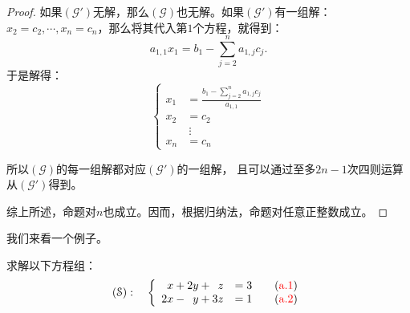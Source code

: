\documentclass[12pt,UTF8,fontset=none]{ctexbook}
\begin{document}
\begin{proof}
    如果$(\mathcal{G}')$无解，那么$(\mathcal{G})$也无解。如果$(\mathcal{G}')$有一组解：
    $x_2 = c_2, \cdots , x_n = c_n$，那么将其代入第$1$个方程，就得到：
    $$ a_{1,1} x_1 = b_{1} - \sum_{j=2}^n a_{1,j} c_j. $$
    于是解得：
    $$ \left\{
        \begin{array}{rl}
        x_1 &= \displaystyle \frac{b_{1} - \sum_{j=2}^n a_{1,j} c_j}{a_{1,1}} \\
        x_2 &= c_2  \\
        \quad & \:\vdots   \\
        x_n &= c_n 
        \end{array}
    \right.$$

    所以$(\mathcal{G})$的每一组解都对应$(\mathcal{G}')$的一组解，
    且可以通过至多$2n-1$次四则运算从$(\mathcal{G}')$得到。

    综上所述，命题对$n$也成立。因而，根据归纳法，命题对任意正整数成立。

\end{proof}

我们来看一个例子。

\begin{et}
    求解以下方程组：
    $$ (\mathcal{S}):\quad \left\{
        \begin{array}{rl}
    x + 2y + \phantom{0}z &= 3 \quad \quad ({\color{red}\mathrm{a}.1})\\
    2x - \phantom{0}y + 3z &= 1  \quad \quad ({\color{red}\mathrm{a}.2})
    \end{array}
    \right. $$    
\end{et}
\end{document}
